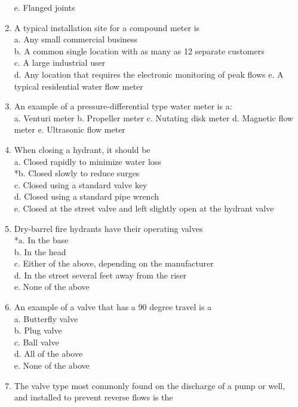 \begin{enumerate}[1.]
e. Flanged joints\\
\item A typical installation site for a compound meter is\\
a. Any small commercial business\\
b. A common single location with as many as 12 separate customers\\
c. A large industrial user\\
d. Any location that requires the electronic monitoring of peak flows e. A typical residential water flow meter\\
\item An example of a pressure-differential type water meter is a:\\
a. Venturi meter b. Propeller meter c. Nutating disk meter d. Magnetic flow meter e. Ultrasonic flow meter\\
\item When closing a hydrant, it should be\\
a. Closed rapidly to minimize water loss\\
*b. Closed slowly to reduce surges\\
c. Closed using a standard valve key\\
d. Closed using a standard pipe wrench\\
e. Closed at the street valve and left slightly open at the hydrant valve\\
\item Dry-barrel fire hydrants have their operating valves\\
*a. In the base\\
b. In the head\\
c. Either of the above, depending on the manufacturer\\
d. In the street several feet away from the riser\\
e. None of the above\\
\item An example of a valve that has a 90 degree travel is a\\
a. Butterfly valve\\
b. Plug valve\\
c. Ball valve\\
d. All of the above\\
e. None of the above\\
\item The valve type most commonly found on the discharge of a pump or well, and installed to prevent reverse flows is the\\

\end{enumerate}
